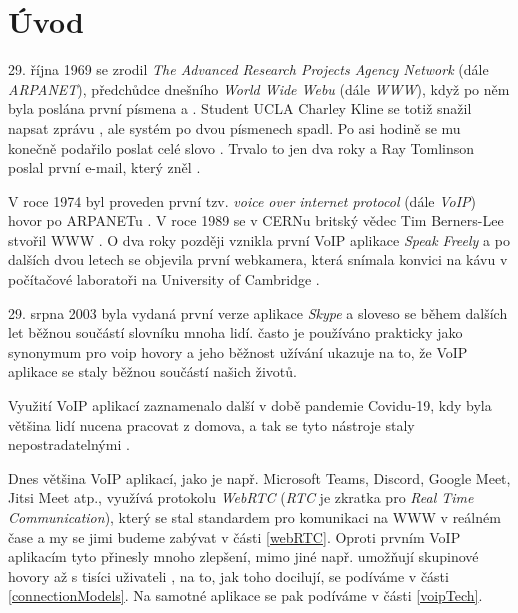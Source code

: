\section{Úvod}

29. října 1969 se zrodil \textit{The Advanced Research Projects Agency Network}
(dále \textit{ARPANET}), předchůdce dnešního \textit{World Wide Webu} (dále
\textit{WWW}), když po něm byla poslána první písmena  a . Student
UCLA Charley Kline se totiž snažil napsat zprávu , ale systém po dvou
písmenech spadl. Po asi hodině se mu konečně podařilo poslat celé slovo
\cite{PBS-SimpleHelloFirstMessageOverARPANET}. Trvalo to jen dva roky a Ray
Tomlinson poslal první e-mail, který zněl  \cite{YahooFinance-SimpleHelloFirstMessageOverARPANET}.

V roce 1974 byl proveden první tzv. \textit{voice over internet protocol} (dále
\textit{VoIP}) hovor po ARPANETu
\cite{DigiFone-WhatYouMightNotKnowAboutTheHistoryOfVoIP}. V roce 1989 se v CERNu
britský vědec Tim Berners-Lee stvořil WWW \cite{CERN-TheBirthOfTheWeb}. O dva
roky později vznikla první VoIP aplikace \textit{Speak Freely}
\cite{DigiFone-WhatYouMightNotKnowAboutTheHistoryOfVoIP} a po dalších dvou letech se
objevila první webkamera, která snímala konvici na kávu v počítačové laboratoři
na University of Cambridge \cite{BBC-FirstWebcamMadeCoffeePotFamous}.

29. srpna 2003 byla vydaná první verze aplikace \textit{Skype}
\cite{ArsTechnica-TheStrangeStoryOfSkype} a sloveso  se během
dalších let běžnou součástí slovníku mnoha lidí. často je používáno prakticky
jako synonymum pro voip hovory a jeho běžnost užívání ukazuje na to, že VoIP
aplikace se staly běžnou součástí našich životů.

Využití VoIP aplikací zaznamenalo další  v době pandemie Covidu-19, kdy
byla většina lidí nucena pracovat z domova, a tak se tyto nástroje staly
nepostradatelnými \cite{OnSIP-VoIPStatsTrendsCovidImpact}.

Dnes většina VoIP aplikací, jako je např. Microsoft Teams, Discord, Google Meet,
Jitsi Meet atp., využívá protokolu \textit{WebRTC} (\textit{RTC} je zkratka pro
\textit{Real Time Communication}), který se stal standardem pro komunikaci na
WWW v reálném čase
\cite{LevelUp-WhatPowerMeetAndTeams, Discord-HowDoesItHandleMillionsOfUsers, Jitsi-Projects,
	WebRTCORG-Homepage} a my se jimi budeme zabývat v části \ref{webRTC}. Oproti
prvním VoIP aplikacím tyto přinesly mnoho zlepšení, mimo jiné např. umožňují
skupinové hovory až s tisíci uživateli
\cite{MicrosoftLearn-MSTeamsLimitsAndSpecs}, na to, jak toho docilují, se
podíváme v části \ref{connectionModels}. Na samotné aplikace se pak podíváme v
části \ref{voipTech}.

